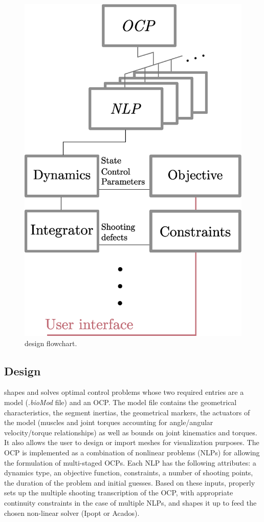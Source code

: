 \begin{figure}[t!]
\centering
\includegraphics[width=0.9\columnwidth]{figures/design.eps}
\caption{\bioptim design flowchart.}
\label{fig:dependencies}
\vspace*{-0.5cm}
\end{figure}


\subsection{Design}
\bioptim shapes and solves optimal control problems whose two required entries are a model (.\textit{bioMod} file) and an OCP.
The model file contains the geometrical characteristics, the segment inertias, the geometrical markers, the actuators of the model (muscles and joint torques accounting for angle/angular velocity/torque relationships) as well as bounds on joint kinematics and torques. 
It also allows the user to design or import meshes for visualization purposes.
The OCP is implemented as a combination of nonlinear problems (NLPs) for allowing the formulation of multi-staged OCPs. Each NLP has the following attributes: a dynamics type, an objective function, constraints, a number of shooting points, the duration of the problem and initial guesses.
Based on these inputs, \bioptim properly sets up the multiple shooting transcription of the OCP, with appropriate continuity constraints in the case of multiple NLPs, and shapes it up to feed the chosen non-linear solver (Ipopt or Acados). 


